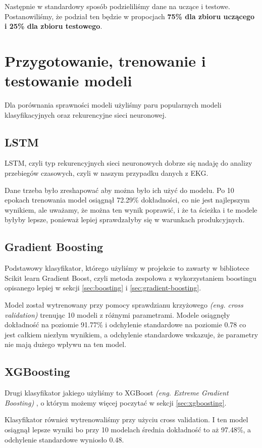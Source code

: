 \documentclass[12pt,a4paper]{article}
\begin{document}
Następnie w standardowy sposób podzieliliśmy dane na uczące i testowe. Postanowiliśmy, że podział ten będzie w propocjach \textbf{75\% dla zbioru uczącego i 25\% dla zbioru testowego}.

\section{Przygotowanie, trenowanie i testowanie modeli}
Dla porównania sprawności modeli użyliśmy paru popularnych modeli klasyfikacyjnych oraz rekurencyjne sieci neuronowej.

\subsection{LSTM}
LSTM, czyli typ rekurencyjnych sieci neuronowych dobrze się nadaję do analizy przebiegów czasowych, czyli w naszym przypadku danych z EKG.

Dane trzeba było zreshapować aby można było ich użyć do modelu. Po 10 epokach trenowania model osiągnął 72.29\% dokładności, co nie jest najlepszym wynikiem, ale uważamy, że można ten wynik poprawić, i że ta ścieżka i te modele byłyby lepsze, ponieważ lepiej sprawdzałyby się w warunkach produkcyjnych.

\subsection{Gradient Boosting}
Podstawowy klasyfikator, którego użyliśmy w projekcie to zawarty w bibliotece Scikit learn Gradient Boost, czyli metoda zespołowa z wykorzystaniem boostingu opisanego lepiej w sekcji \ref{sec:boosting} i \ref{sec:gradient-boosting}.

Model został wytrenowany przy pomocy sprawdzianu krzyżowego \textit{(eng. cross validation)} trenując 10 modeli z różnymi parametrami. Modele osiągnęły dokładność na poziomie 91.77\% i odchylenie standardowe na poziomie 0.78 co jest całkiem niezłym wynikiem, a odchylenie standardowe wskazuje, że parametry nie mają dużego wpływu na ten model. 

\subsection{XGBoosting}
Drugi klasyfikator jakiego użyliśmy to XGBoost \textit{(eng. Extreme Gradient Boosting)} \cite{xg-boost}, o którym możemy więcej poczytać w sekcji \ref{sec:xgboosting}.

Klasyfikator również wytrenowaliśmy przy użyciu cross validation. I ten model osiągnął lepsze wyniki bo przy 10 modelach średnia dokładność to aż 97.48\%, a odchylenie standardowe wyniosło 0.48. 
\end{document}
